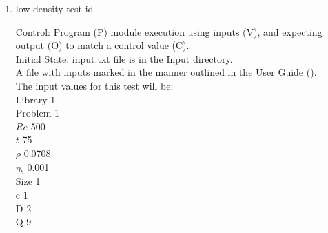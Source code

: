 \documentclass[12pt, titlepage]{article}
\newcommand{\famname}{Lattice Boltzmann Solver}
\newcounter{testcounter} %
\begin{document}
\begin{enumerate}
Output: Vorticity vector values printed to the screen. \\

Test Case Derivation: This case is a comparison with the pseudo-oracle
pyLBM. The C values of this test for pyLBM can be found in the file
id6output.txt located in the OracleOutput folder. The output values of {\famname} will be compared to the pseudo-oracle output values.

This test covers a very large Reynolds number representing very turbulent flow.\\	
					
How test will be performed: 

\begin{enumerate}
\item The Von Karman Vortex Street module shall be modified by the author to
  print the vorticity vector as output.
\item Outside of the system, the input parameter values will be written to a text file titled input.txt, as outlined in the User Guide.
\item The file will be placed into the Input directory, under the home directory of the project.
\item {\famname} shall be run.
\item Upon completion of the module, the output values of the vorticity vector
  will be compared to the vorticity vector values from pyLBM - comparison will
  be done per cell. Comparisons can be done manually using Excel, or through a
  script, using the equation for relative error found in Section \ref{eqerror}.
\end{enumerate}

\item{low-density-test-id\thetestcounter \\}

Control: Program (P) module execution using inputs (V), and expecting output (O)
to match a control value (C).\\
					
Initial State: input.txt file is in the Input directory.\\
					
A file with inputs marked in the manner outlined in the User
Guide (\citet{LBM_UserGuide_PM}).\\The input values for this test will be:\\
Library 1\\
Problem 1\\
$Re$ 500\\
$t$ 75\\
$\rho$ 0.0708\\
$\eta_b$ 0.001\\
Size 1\\
$\mathrm{e}$ 1\\
$\mathrm{D}$ 2\\
$\mathrm{Q}$ 9\\


\end{enumerate}
\end{document}
